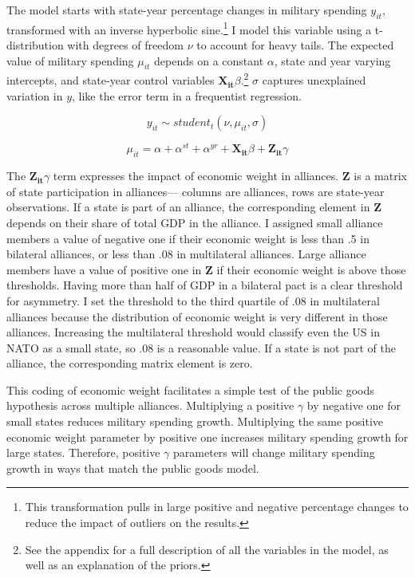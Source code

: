 \documentclass[12pt]{article}
\begin{document}
The model starts with state-year percentage changes in military spending $y_{it}$, transformed with an inverse hyperbolic sine.\footnote{This transformation pulls in large positive and negative percentage changes to reduce the impact of outliers on the results.}
I model this variable using a t-distribution with degrees of freedom $\nu$ to account for heavy tails.
The expected value of military spending $\mu_{it}$ depends on a constant $\alpha$, state and year varying intercepts, and state-year control variables $\mathbf{X_{it}} \beta$.\footnote{See the appendix for a full description of all the variables in the model, as well as an explanation of the priors.} 
$\sigma$ captures unexplained variation in $y$, like the error term in a frequentist regression. 

\begin{equation}
y_{it} \sim student_t(\nu, \mu_{it}, \sigma) 
\end{equation}

\begin{equation}
\mu_{it} = \alpha + \alpha^{st} + \alpha^{yr} + \mathbf{X_{it}} \beta + \mathbf{Z_{it}} \gamma
\end{equation}


The $\mathbf{Z_{it}} \gamma$ term expresses the impact of economic weight in alliances.  
$\textbf{Z}$ is a matrix of state participation in alliances--- columns are alliances, rows are state-year observations.  
If a state is part of an alliance, the corresponding element in $\textbf{Z}$ depends on their share of total GDP in the alliance. 
I assigned small alliance members a value of negative one if their economic weight is less than .5 in bilateral alliances, or less than .08 in multilateral alliances.
Large alliance members have a value of positive one in $\textbf{Z}$ if their economic weight is above those thresholds. 
Having more than half of GDP in a bilateral pact is a clear threshold for asymmetry. 
I set the threshold to the third quartile of .08 in multilateral alliances because the distribution of economic weight is very different in those alliances. 
Increasing the multilateral threshold would classify even the US in NATO as a small state, so .08 is a reasonable value. 
If a state is not part of the alliance, the corresponding matrix element is zero.


This coding of economic weight facilitates a simple test of the public goods hypothesis across multiple alliances. 
Multiplying a positive $\gamma$ by negative one for small states reduces military spending growth.
Multiplying the same positive economic weight parameter by positive one increases military spending growth for large states. 
Therefore, positive $\gamma$ parameters will change military spending growth in ways that match the public goods model. 
\end{document}
